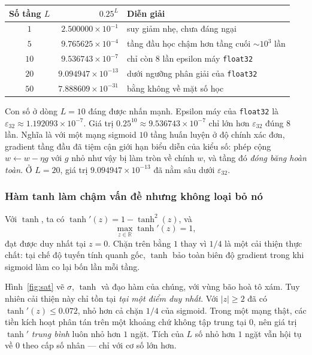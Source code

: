 \begin{table}[H]
\centering
\begin{captionaboveboxaivn}
\end{captionaboveboxaivn}
\begin{tabular}{@{}crl@{}}
\toprule
\rowcolor{rowLavender}
\textbf{Số tầng $L$} & \textbf{$0.25^{L}$} & \textbf{Diễn giải} \\
\midrule
$1$  & $2.500000\times10^{-1}$  & suy giảm nhẹ, chưa đáng ngại \\
$5$  & $9.765625\times10^{-4}$  & tầng đầu học chậm hơn tầng cuối $\sim10^3$ lần \\
$10$ & $9.536743\times10^{-7}$  & chỉ còn $8$ lần epsilon máy \texttt{float32} \\
$20$ & $9.094947\times10^{-13}$ & dưới ngưỡng phân giải của \texttt{float32} \\
$50$ & $7.888609\times10^{-31}$ & bằng không về mặt số học \\
\bottomrule
\end{tabular}
\end{table}

Con số ở dòng $L=10$ đáng được nhấn mạnh. Epsilon máy của \texttt{float32} là
$\varepsilon_{32} \approx 1.192093\times10^{-7}$. Giá trị $0.25^{10} \approx
9.536743\times10^{-7}$ chỉ lớn hơn $\varepsilon_{32}$ đúng $8$ lần. Nghĩa là với
một mạng sigmoid $10$ tầng huấn luyện ở độ chính xác đơn, gradient tầng đầu đã
tiệm cận giới hạn biểu diễn của kiểu số: phép cộng $w \leftarrow w - \eta g$ với
$g$ nhỏ như vậy bị làm tròn về chính $w$, và tầng đó \emph{đóng băng hoàn toàn}.
Ở $L=20$, giá trị $9.094947\times10^{-13}$ đã nằm sâu dưới $\varepsilon_{32}$.

\subsubsection{Hàm tanh làm chậm vấn đề nhưng không loại bỏ nó}

Với $\tanh$, ta có $\tanh'(z) = 1 - \tanh^2(z)$, và
\[
  \max_{z\in\mathbb{R}}\tanh'(z) = 1,
\]
đạt được duy nhất tại $z = 0$. Chặn trên bằng $1$ thay vì $1/4$ là một cải thiện
thực chất: tại chế độ tuyến tính quanh gốc, $\tanh$ bảo toàn biên độ gradient
trong khi sigmoid làm co lại bốn lần mỗi tầng.

Hình~\ref{fig:sat} vẽ $\sigma$, $\tanh$ và đạo hàm của chúng, với vùng bão hoà tô
xám. Tuy nhiên cải thiện này chỉ tồn tại \emph{tại một điểm duy nhất}. Với $|z|\ge 2$
đã có $\tanh'(z) \le 0.072$, nhỏ hơn cả chặn $1/4$ của sigmoid. Trong một mạng
thật, các tiền kích hoạt phân tán trên một khoảng chứ không tập trung tại $0$, nên
giá trị $\tanh'$ \emph{trung bình} luôn nhỏ hơn $1$ ngặt. Tích của $L$ số nhỏ hơn
$1$ ngặt vẫn hội tụ về $0$ theo cấp số nhân --- chỉ với cơ số lớn hơn.

